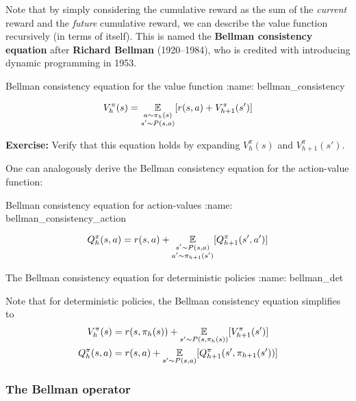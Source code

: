 \documentclass[\main/main]{subfiles}
\begin{document}
Note that by simply considering the cumulative reward as the sum of the \emph{current} reward and the \emph{future} cumulative reward, we can describe the value function recursively (in terms of itself). This is named the \textbf{Bellman consistency equation} after \textbf{Richard Bellman} (1920--1984), who is credited with introducing dynamic programming in 1953.

\begin{definition}{Bellman consistency equation for the value function}
:name: bellman_consistency

\begin{equation}
    V_h^\pi(s) = \operatorname*{\mathbb{E}}_{\substack{a \sim \pi_h(s) \\ s' \sim P(s, a)}} [r(s, a) + V_{h+1}^\pi(s')] \label{eq:bellman_consistency}
\end{equation}
\end{definition}


\textbf{Exercise:} Verify that this equation holds by expanding $V_h^\pi(s)$ and $V_{h+1}^\pi(s')$.

One can analogously derive the Bellman consistency equation for the action-value function:

\begin{definition}{Bellman consistency equation for action-values}
:name: bellman_consistency_action

\[
    Q_h^\pi(s, a) = r(s, a) + \operatorname*{\mathbb{E}}_{\substack{s' \sim P(s, a) \\ a' \sim \pi_{h+1}(s')}} [Q_{h+1}^\pi(s', a')]
\]
\end{definition}

\begin{remark}{The Bellman consistency equation for deterministic policies}
:name: bellman_det

    Note that for deterministic policies, the Bellman consistency equation simplifies to
    \begin{align*}
        V_h^\pi(s) &= r(s, \pi_h(s)) + \operatorname*{\mathbb{E}}_{s' \sim P(s, \pi_h(s))} [V_{h+1}^\pi(s')] \\
        Q_h^\pi(s, a) &= r(s, a) + \operatorname*{\mathbb{E}}_{s' \sim P(s, a)} [Q_{h+1}^\pi(s', \pi_{h+1}(s'))]
    \end{align*}
\end{remark}

\subsubsection{The Bellman operator}
\label{sec:bellman_operator}
\end{document}
